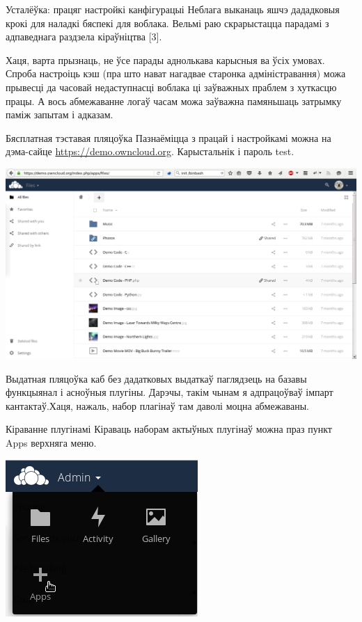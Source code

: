 \documentclass[ignorenonframetext,hyperref={pdftex,unicode}]{beamer}
\begin{document}
\begin{frame}{Усталёўка: працяг настройкі канфігурацыі}
	Неблага выканаць яшчэ дададковыя крокі для наладкі бяспекі для воблака. Вельмі раю скрарыстацца парадамі з адпаведнага раздзела кіраўніцтва [3]. 

	Хаця, варта прызнаць, не ўсе парады аднолькава карысныя ва ўсіх умовах. Спроба настроіць кэш (пра што нават нагадвае старонка адміністравання) можа прывесці да часовай недаступнасці воблака ці заўважных праблем з хуткасцю працы. А вось абмежаванне логаў часам можа заўважна памяньшаць затрымку паміж запытам і адказам.
\end{frame}

\begin{frame}{Бясплатная тэставая пляцоўка}
	Пазнаёміцца з працай і настройкамі можна на дэма-сайце \url{https://demo.owncloud.org}. Карыстальнік і пароль test. 

	\begin{center}
 		\includegraphics[height=0.5\textheight,keepaspectratio]{demo}
	\end{center}
	
	Выдатная пляцоўка каб без дадатковых выдаткаў паглядзець на базавы функцыянал і асноўныя плугіны. Дарэчы, такім чынам я адпрацоўваў імпарт кантактаў.Хаця, нажаль, набор плагінаў там даволі моцна абмежаваны.
\end{frame}

\begin{frame}{Кіраванне плугінамі}
	Кіраваць наборам актыўных плугінаў можна праз пункт Apps верхняга меню.

	\begin{center}
 		\includegraphics[height=0.4\textheight,keepaspectratio]{apps}
	\end{center}
\end{frame}
\end{document}
